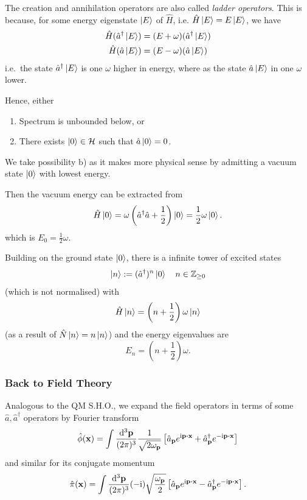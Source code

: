 \documentclass[a4paper,11pt]{article}
\begin{document}
	The creation and annihilation operators are also called \emph{ladder operators}. This is because, for some energy eigenstate $\ket{E}$ of $\hat H$, i.e. $\hat H \ket{E} = E \ket{E}$, we have
	\begin{align*}
		\hat H (\hat a^\dagger \ket{E}) & = (E + \omega)(\hat a^\dagger \ket{E})\\
		\hat H (\hat a \ket{E}) & = (E - \omega)(\hat a \ket{E})\\
	\end{align*}
	i.e.\ the state $\hat a^\dagger \ket{E}$ is one $\omega$ higher in energy, where as the state $\hat a \ket{E}$ in one $\omega$ lower.
	
	Hence, either
	\begin{enumerate}
		\item Spectrum is unbounded below, or
		\item There exists $\ket{0}\in \mathcal{H}$ such that $\hat a \ket{0}=0$.
	\end{enumerate}

	We take possibility b) as it makes more physical sense by admitting a vacuum state $\ket{0}$ with lowest energy.

	Then the vacuum energy can be extracted from
	\[
		\hat H \ket{0} = \omega \left( \hat a^\dagger \hat a + \frac{1}{2}\right) \ket{0} = \frac{1}{2} \omega \ket{0}.
	\]
	which is $E_0 = \frac{1}{2} \omega$.

	Building on the ground state $\ket{0}$, there is a infinite tower of excited states
	\[
		\ket{n} := (\hat a^\dagger)^n \ket{0} \quad n \in \mathbb{Z}_{\geq 0}
	\]
	(which is not normalised) with
	\[
		\hat H \ket{n} = \left( n + \frac{1}{2} \right) \omega \ket{n}
	\]
	(as a result of $\hat N \ket{n} = n \ket{n}$) and the energy eigenvalues are
	\[
		E_n = \left( n + \frac{1}{2} \right) \omega.
	\]
	
	\subsubsection{Back to Field Theory}
	
	Analogous to the QM S.H.O., we expand the field operators in terms of some $\hat a, \hat a^\dagger$ operators by Fourier transform
	\begin{equation}
		\hat \phi (\vb x) = \int \ddk{\vb p}{3} \frac{1}{\sqrt{2 \omega _{\vb p}}} \left[ \hat a _{\vb p} e ^{\mathrm{i} \vb p \vdot \vb x} + \hat a^\dagger _{\vb p} e ^{-\mathrm{i} \vb p \vdot \vb x} \right]
	\end{equation}
	and similar for its conjugate momentum
	\begin{equation}
		\hat \pi (\vb x) = \int \ddk{\vb p}{3} (-\mathrm{i}) \sqrt{\frac{\omega _{\vb p}}{2}} \left[ \hat a _{\vb p} e ^{\mathrm{i} \vb p \vdot \vb x} - \hat a^\dagger _{\vb p} e ^{-\mathrm{i} \vb p \vdot \vb x} \right].
	\end{equation}
\end{document}
